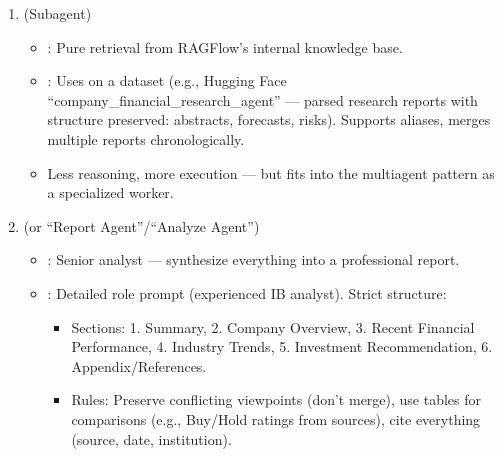 \documentclass[letterpaper,10pt,english]{sphinxmanual}
\begin{document}
\begin{enumerate}
\begin{itemize}
\item {} 
\sphinxAtStartPar
{}: This is where 
shines — it autonomously plans steps (“I need external + internal
\(\rightarrow\) call these”), calls tools/agents, aggregates results.

\end{itemize}

\item {} 
\sphinxAtStartPar
{} (Sub\sphinxhyphen{}agent)
\begin{itemize}
\item {} 
\sphinxAtStartPar
{}: Pure retrieval from RAGFlow’s internal knowledge base.

\item {} 
\sphinxAtStartPar
{}: Uses  on a dataset (e.g., Hugging
Face “company\_financial\_research\_agent” — parsed research reports
with structure preserved: abstracts, forecasts, risks). Supports
aliases, merges multiple reports chronologically.

\item {} 
\sphinxAtStartPar
{} Less reasoning, more execution — but fits into the
multi\sphinxhyphen{}agent pattern as a specialized worker.

\end{itemize}

\item {} 
\sphinxAtStartPar
{} (or “Report Agent”/“Analyze
Agent”)
\begin{itemize}
\item {} 
\sphinxAtStartPar
{}: Senior analyst — synthesize everything into a
professional report.

\item {} 
\sphinxAtStartPar
{}: Detailed role prompt (experienced IB analyst). Strict
structure:
\begin{itemize}
\item {} 
\sphinxAtStartPar
Sections: 1. Summary, 2. Company Overview, 3. Recent Financial
Performance, 4. Industry Trends, 5. Investment Recommendation,
6. Appendix/References.

\item {} 
\sphinxAtStartPar
Rules: Preserve conflicting viewpoints (don’t merge), use
tables for comparisons (e.g., Buy/Hold ratings from sources),
cite everything (source, date, institution).


\end{itemize}
\end{itemize}
\end{enumerate}
\end{document}
